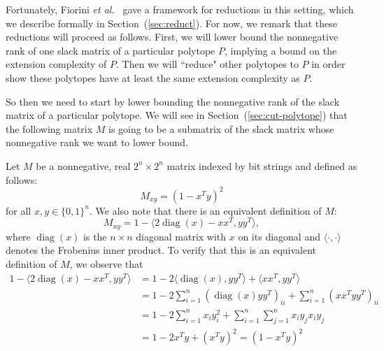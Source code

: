 \documentclass{article}
\makeatletter
\theoremstyle{definition}
\theoremstyle{remark}
\newcommand{\cetal}{\textit{et al.\@}}  %
\newcommand{\diag}{\operatorname{diag}}
\newcommand{\bits}{\{0,1\}}
\makeatother
\begin{document}
Fortunately, Fiorini \cetal~\cite{fiorini} gave a framework for reductions in this setting, which we describe formally in Section~(\ref{sec:reduct}). For now, we remark that these reductions will proceed as follows. First, we will lower bound the nonnegative rank of one slack matrix of a particular polytope $P$, implying a bound on the extension complexity of $P$. Then we will ``reduce" other polytopes to $P$ in order show these polytopes have at least the same extension complexity as $P$. 

So then we need to start by lower bounding the nonnegative rank of the slack matrix of a particular polytope. We will see in Section~(\ref{sec:cut-polytope}) that the following matrix $M$ is going to be a submatrix of the slack matrix whose nonnegative rank we want to lower bound.

Let $M$ be a nonnegative, real $2^n \times 2^n$ matrix indexed by bit strings and defined as follows:
\[
M_{xy} = {(1 - x^Ty)}^2
\]
for all $x,y \in \bits^n$. We also note that there is an equivalent definition of $M$:
\[
M_{xy} = 1 - \langle 2\diag(x) - xx^T, yy^T\rangle,
\]
where $\diag(x)$ is the $n \times n$ diagonal matrix with $x$ on its diagonal and $\langle\cdot, \cdot\rangle$ denotes the Frobenius inner product. To verify that this is an equivalent definition of $M$, we observe that
\begin{align*}
1 - \langle 2\diag(x) - xx^T, yy^T\rangle & = 1 - 2\langle\diag(x), yy^T\rangle + \langle xx^T, yy^T\rangle \\
& = 1 - 2 \sum_{i=1}^n (\diag(x)yy^T)_{ii} + \sum_{i=1}^n (xx^Tyy^T)_{ii}  \\
& = 1 - 2 \sum_{i=1}^n x_{i} y_{i}^2 + \sum_{i=1}^n \sum_{j=1}^n x_iy_jx_iy_j \\
& =  1 - 2 x^Ty + {(x^Ty)}^2 = {(1 - x^Ty)}^2
\end{align*}
\end{document}
